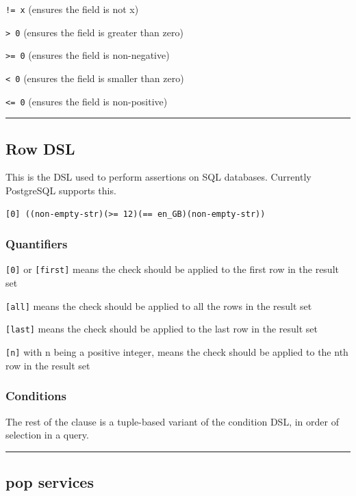 \documentclass[11pt]{article}
\begin{document}
\texttt{!= x} (ensures the field is not x)

\texttt{> 0} (ensures the field is greater than zero)

\texttt{>= 0} (ensures the field is non-negative)

\texttt{< 0} (ensures the field is smaller than zero)

\texttt{<= 0} (ensures the field is non-positive)

\noindent\rule{\textwidth}{0.5pt}

\subsection{Row DSL}
\label{sec:org1e6a033}

This is the DSL used to perform assertions on SQL databases. Currently PostgreSQL supports this.

\begin{verbatim}
[0] ((non-empty-str)(>= 12)(== en_GB)(non-empty-str))
\end{verbatim}


\subsubsection{Quantifiers}
\label{sec:org262660e}

\texttt{[0]} or \texttt{[first]} means the check should be applied to the first row in the result set

\texttt{[all]} means the check should be applied to all the rows in the result set

\texttt{[last]} means the check should be applied to the last row in the result set

\texttt{[n]} with n being a positive integer, means the check should be applied to the nth row in the result set

\subsubsection{Conditions}
\label{sec:orgbbb63e0}

The rest of the clause is a tuple-based variant of the condition DSL, in order of selection in a query.

\noindent\rule{\textwidth}{0.5pt}

\subsection{pop services}
\label{sec:org31822cc}
\end{document}
